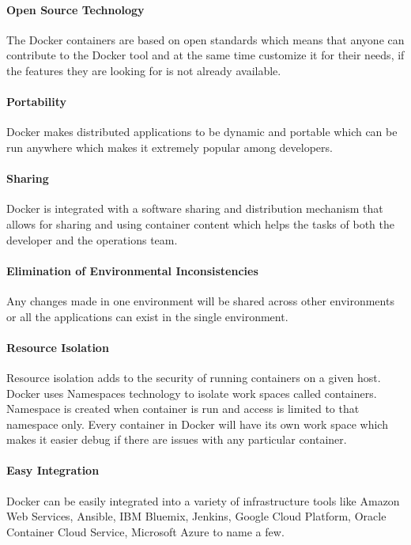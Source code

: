 	\paragraph{Open Source Technology}
	The Docker containers are based on open standards which means that
  anyone can contribute to the Docker tool and at the same time
  customize it for their needs, if the features they are looking for
  is not already available.
  
	\paragraph{Portability}
	Docker makes distributed applications to be dynamic and portable
  which can be run anywhere which makes it extremely popular among
  developers.
  
	\paragraph{Sharing}
	Docker is integrated with a software sharing and distribution
  mechanism that allows for sharing and using container content which
  helps the tasks of both the developer and the operations team.
  
	\paragraph{Elimination of Environmental Inconsistencies}
	Any changes made in one environment will be shared across other
  environments or all the applications can exist in the single 
  environment.
  
	\paragraph{Resource Isolation}
	Resource isolation adds to the security of running containers on a
  given host. Docker uses Namespaces technology to isolate work spaces
  called containers. Namespace is created when container is run and
  access is limited to that namespace only. Every container in Docker
  will have its own work space which makes it easier debug if there
  are issues with any particular container.
  
	\paragraph{Easy Integration}
	Docker can be easily integrated into a variety of infrastructure
  tools like Amazon Web Services, Ansible, IBM Bluemix, Jenkins,
  Google Cloud Platform, Oracle Container Cloud Service, Microsoft
  Azure to name a few.
  
